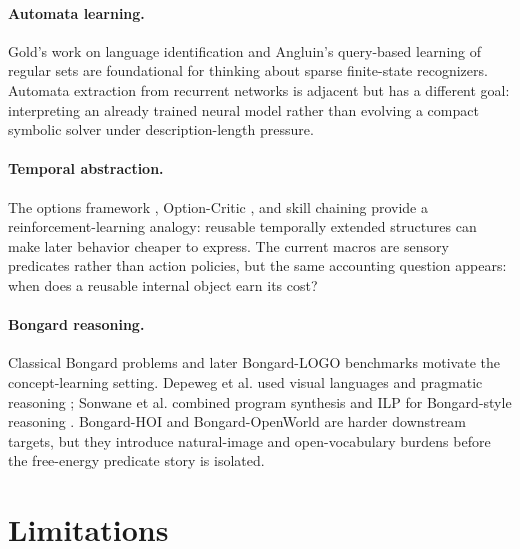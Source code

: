 \documentclass[11pt]{article}
\begin{document}
\paragraph{Automata learning.}
Gold's work on language identification \cite{gold1967language} and Angluin's
query-based learning of regular sets \cite{angluin1987learning} are
foundational for thinking about sparse finite-state recognizers. Automata
extraction from recurrent networks \cite{weiss2018extracting} is adjacent but
has a different goal: interpreting an already trained neural model rather than
evolving a compact symbolic solver under description-length pressure.

\paragraph{Temporal abstraction.}
The options framework \cite{sutton1999between}, Option-Critic
\cite{bacon2017option}, and skill chaining \cite{konidaris2009skill} provide a
reinforcement-learning analogy: reusable temporally extended structures can
make later behavior cheaper to express. The current macros are sensory
predicates rather than action policies, but the same accounting question
appears: when does a reusable internal object earn its cost?

\paragraph{Bongard reasoning.}
Classical Bongard problems and later Bongard-LOGO benchmarks
\cite{bongard1970pattern,nie2020bongardlogo} motivate the concept-learning
setting. Depeweg et al. used visual languages and pragmatic reasoning
\cite{depeweg2018solving}; Sonwane et al. combined program synthesis and ILP
for Bongard-style reasoning \cite{sonwane2021using}. Bongard-HOI
\cite{jiang2022bongardhoi} and Bongard-OpenWorld \cite{wu2023bongardopenworld}
are harder downstream targets, but they introduce natural-image and
open-vocabulary burdens before the free-energy predicate story is isolated.

\section{Limitations}
\end{document}
